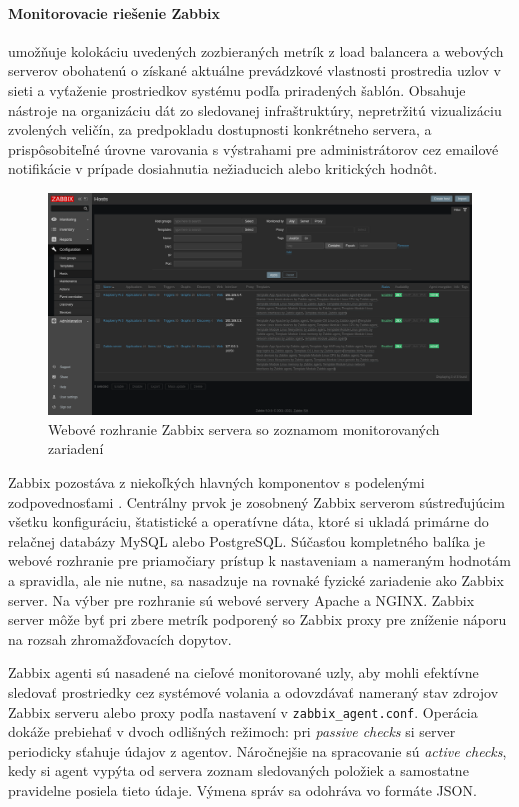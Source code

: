 \documentclass[12pt, a4paper]{article}
\begin{document}
\paragraph{Monitorovacie riešenie Zabbix} umožňuje kolokáciu uvedených zozbieraných metrík z load balancera
a webových serverov obohatenú o získané aktuálne prevádzkové vlastnosti prostredia uzlov v sieti
a vyťaženie prostriedkov systému podľa priradených šablón. Obsahuje nástroje na organizáciu dát zo 
sledovanej infraštruktúry, nepretržitú vizualizáciu zvolených veličín, za predpokladu dostupnosti 
konkrétneho servera, a prispôsobiteľné úrovne varovania s výstrahami pre administrátorov cez emailové 
notifikácie v prípade dosiahnutia nežiaducich alebo kritických hodnôt.
\begin{figure}[h]
	\centering
  	\includegraphics[width=\textwidth]{images/zabbix-host-config.png}
  	\caption{Webové rozhranie Zabbix servera so zoznamom monitorovaných zariadení}
\end{figure}

Zabbix pozostáva z niekoľkých hlavných komponentov s podelenými zodpovednosťami \cite{zabbix-monitoring}.
Centrálny prvok je zosobnený Zabbix serverom sústreďujúcim všetku konfiguráciu, štatistické a operatívne 
dáta, ktoré si ukladá primárne do relačnej databázy MySQL alebo PostgreSQL. 
Súčasťou kompletného balíka je webové rozhranie pre priamočiary 
prístup k nastaveniam a nameraným hodnotám a spravidla, ale nie nutne, sa nasadzuje na rovnaké fyzické 
zariadenie ako Zabbix server. Na výber pre rozhranie sú webové servery Apache a NGINX. Zabbix server môže 
byť pri zbere metrík podporený so Zabbix proxy pre zníženie náporu na rozsah zhromažďovacích dopytov. 

Zabbix agenti sú nasadené na cieľové monitorované uzly, aby mohli efektívne sledovať prostriedky cez 
systémové volania a odovzdávať nameraný stav zdrojov Zabbix serveru alebo proxy podľa 
nastavení v \verb|zabbix_agent.conf|. Operácia dokáže prebiehať v dvoch odlišných režimoch: 
pri \emph{passive checks}
si server periodicky sťahuje údajov z agentov. Náročnejšie na spracovanie sú \emph{active checks}, kedy
si agent vypýta od servera zoznam sledovaných položiek a samostatne pravidelne posiela tieto údaje. Výmena 
správ sa odohráva vo formáte JSON.
\end{document}
